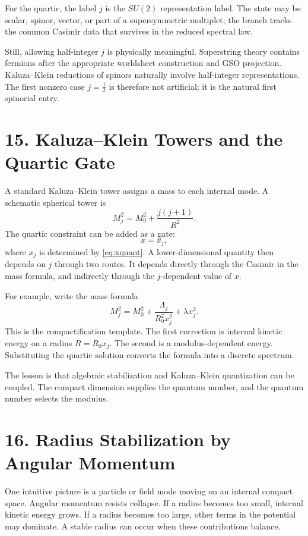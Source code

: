 \documentclass[11pt]{article}
\newcommand{\Lspin}{\Lambda_j}
\begin{document}
For the quartic, the label \(j\) is the \(SU(2)\) representation label. The state may be scalar, spinor, vector, or part of a supersymmetric multiplet; the branch tracks the common Casimir data that survives in the reduced spectral law.

Still, allowing half-integer \(j\) is physically meaningful. Superstring theory contains fermions after the appropriate worldsheet construction and GSO projection. Kaluza--Klein reductions of spinors naturally involve half-integer representations. The first nonzero case \(j=\frac12\) is therefore not artificial; it is the natural first spinorial entry.


\section*{15. Kaluza--Klein Towers and the Quartic Gate}

A standard Kaluza--Klein tower assigns a mass to each internal mode. A schematic spherical tower is
\[
        M_j^2=M_0^2+\frac{j(j+1)}{R^2}.
\]
The quartic constraint can be added as a gate:
\[
        x=x_j ,
\]
where \(x_j\) is determined by \eqref{eq:xquant}. A lower-dimensional quantity then depends on \(j\) through two routes. It depends directly through the Casimir in the mass formula, and indirectly through the \(j\)-dependent value of \(x\).

For example, write the mass formula
\[
        M_j^2=M_0^2+\frac{\Lspin}{R_0^2x_j^2}
        +\lambda x_j^2 .
\]
This is the compactification template. The first correction is internal kinetic energy on a radius \(R=R_0x_j\). The second is a modulus-dependent energy. Substituting the quartic solution converts the formula into a discrete spectrum.

The lesson is that algebraic stabilization and Kaluza--Klein quantization can be coupled. The compact dimension supplies the quantum number, and the quantum number selects the modulus.


\section*{16. Radius Stabilization by Angular Momentum}

One intuitive picture is a particle or field mode moving on an internal compact space. Angular momentum resists collapse. If a radius becomes too small, internal kinetic energy grows. If a radius becomes too large, other terms in the potential may dominate. A stable radius can occur when these contributions balance.
\end{document}
